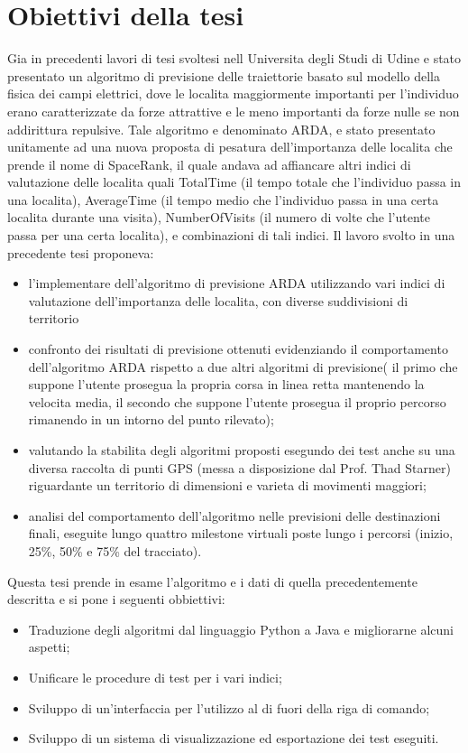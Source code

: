 \section{Obiettivi della tesi}
Gia in precedenti lavori di tesi svoltesi nell Universita degli Studi di Udine e
stato presentato un algoritmo di previsione delle traiettorie basato sul modello
della fisica dei campi elettrici, dove le localita maggiormente importanti
per l'individuo erano caratterizzate da forze attrattive e le meno importanti
da forze nulle se non addirittura repulsive. Tale algoritmo e denominato
ARDA, e stato presentato unitamente ad una nuova proposta di pesatura dell'importanza
delle localita che prende il nome di SpaceRank, il quale andava
ad affiancare altri indici di valutazione delle localita quali TotalTime (il tempo
totale che l'individuo passa in una localita), AverageTime (il tempo medio che
l'individuo passa in una certa localita durante una visita), NumberOfVisits (il
numero di volte che l'utente passa per una certa localita), e combinazioni di
tali indici.
Il lavoro svolto in una precedente tesi \cite{new_1} proponeva:
\begin{itemize}
\item l'implementare dell'algoritmo di previsione ARDA utilizzando vari indici di valutazione
dell'importanza delle localita, con diverse suddivisioni di territorio

\item confronto dei risultati di previsione ottenuti evidenziando il comportamento
dell'algoritmo ARDA rispetto a due altri algoritmi di previsione( il primo
che suppone l'utente prosegua la propria corsa in linea retta mantenendo la
velocita media, il secondo che suppone l'utente prosegua il proprio percorso
rimanendo in un intorno del punto rilevato);

\item valutando la stabilita degli algoritmi proposti esegundo dei test anche su una diversa raccolta di punti GPS (messa a disposizione
dal Prof. Thad Starner) riguardante un territorio di dimensioni e varieta di movimenti maggiori;

\item analisi del comportamento dell'algoritmo nelle previsioni delle destinazioni finali, eseguite
lungo quattro milestone virtuali poste lungo i percorsi (inizio, 25\%, 50\% e 75\% del tracciato).

\end{itemize}

Questa tesi prende in esame l'algoritmo e i dati di quella precedentemente descritta e si pone i seguenti obbiettivi:
\begin{itemize}
\item Traduzione degli algoritmi dal linguaggio Python a Java e migliorarne alcuni aspetti;
\item Unificare le procedure di test per i vari indici;
\item Sviluppo di un'interfaccia per l'utilizzo al di fuori della riga di comando;
\item Sviluppo di un sistema di visualizzazione ed esportazione dei test eseguiti.
\end{itemize}

